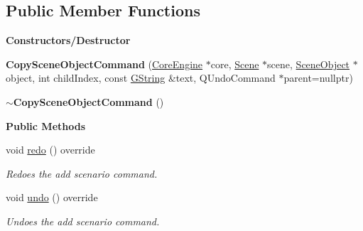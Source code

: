 \subsection*{Public Member Functions}
\begin{Indent}\textbf{ Constructors/\+Destructor}\par
\begin{DoxyCompactItemize}
\item 
\mbox{\label{classrev_1_1_copy_scene_object_command_af07b41812241453d3348c2d83ae9bb68}} 
{\bfseries Copy\+Scene\+Object\+Command} (\mbox{\hyperlink{classrev_1_1_core_engine}{Core\+Engine}} $\ast$core, \mbox{\hyperlink{classrev_1_1_scene}{Scene}} $\ast$scene, \mbox{\hyperlink{classrev_1_1_scene_object}{Scene\+Object}} $\ast$object, int child\+Index, const \mbox{\hyperlink{classrev_1_1_g_string}{G\+String}} \&text, Q\+Undo\+Command $\ast$parent=nullptr)
\item 
\mbox{\label{classrev_1_1_copy_scene_object_command_ae889cbcecf4cb3df4da58ae85ec921ec}} 
{\bfseries $\sim$\+Copy\+Scene\+Object\+Command} ()
\end{DoxyCompactItemize}
\end{Indent}
\begin{Indent}\textbf{ Public Methods}\par
\begin{DoxyCompactItemize}
\item 
\mbox{\label{classrev_1_1_copy_scene_object_command_a554246122c70fc47ef7f2fd65b81d974}} 
void \mbox{\hyperlink{classrev_1_1_copy_scene_object_command_a554246122c70fc47ef7f2fd65b81d974}{redo}} () override
\begin{DoxyCompactList}\small\item\em Redoes the add scenario command. \end{DoxyCompactList}\item 
\mbox{\label{classrev_1_1_copy_scene_object_command_a63a9ac77d53ab4c55f47ab522a8c16dc}} 
void \mbox{\hyperlink{classrev_1_1_copy_scene_object_command_a63a9ac77d53ab4c55f47ab522a8c16dc}{undo}} () override
\begin{DoxyCompactList}\small\item\em Undoes the add scenario command. \end{DoxyCompactList}\end{DoxyCompactItemize}
\end{Indent}
